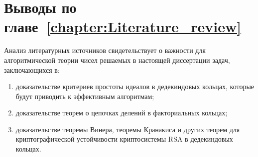 \documentclass[_00_dissertation.tex]{subfiles}
\begin{document}
\section*{Выводы по главе~\ref{chapter:Literature_review}}

Анализ литературных источников свидетельствует о важности для алгоритмической теории чисел решаемых в настоящей диссертации задач, заключающихся в:
\begin{enumerate}
    \item доказательстве критериев простоты идеалов в дедекиндовых кольцах, которые будут приводить к эффективным алгоритмам;

    \item доказательстве теорем о цепочках делений в факториальных кольцах;

    \item доказательстве теоремы Винера, теоремы Кранакиса и других теорем для криптографической устойчивости криптосистемы RSA в дедекиндовых кольцах.
\end{enumerate}

\onlyinsubfile{
    
}
\end{document}
